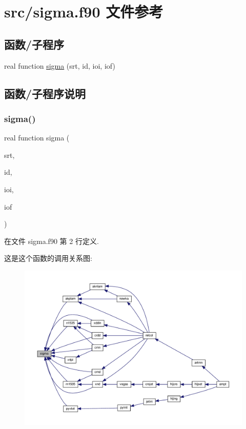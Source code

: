 \hypertarget{sigma_8f90}{}\section{src/sigma.f90 文件参考}
\label{sigma_8f90}
\subsection*{函数/子程序}
\begin{DoxyCompactItemize}
\item 
real function \mbox{\hyperlink{sigma_8f90_a100a3859006a443e954400ad0b7f7f71}{sigma}} (srt, id, ioi, iof)
\end{DoxyCompactItemize}


\subsection{函数/子程序说明}
\mbox{\label{sigma_8f90_a100a3859006a443e954400ad0b7f7f71}} 
\subsubsection{\texorpdfstring{sigma()}{sigma()}}
{\footnotesize\ttfamily real function sigma (\begin{DoxyParamCaption}\item[{}]{srt,  }\item[{}]{id,  }\item[{}]{ioi,  }\item[{}]{iof }\end{DoxyParamCaption})}



在文件 sigma.\+f90 第 2 行定义.

这是这个函数的调用关系图\+:
\nopagebreak
\begin{figure}[H]
\begin{center}
\leavevmode
\includegraphics[width=350pt]{sigma_8f90_a100a3859006a443e954400ad0b7f7f71_icgraph}
\end{center}
\end{figure}
